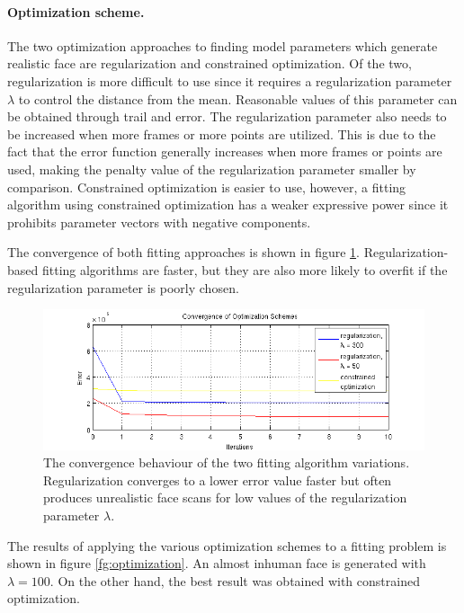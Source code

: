 \documentclass[11pt,a4paper,twoside]{report}
\begin{document}
\paragraph{Optimization scheme.}
The two optimization approaches to finding model parameters which generate
realistic face are regularization and constrained optimization. Of the two,
regularization is more difficult to use since it requires a regularization
parameter $\lambda$ to control the distance from the mean. Reasonable values of
this parameter can be obtained through trail and error. The regularization
parameter also needs to be increased when more frames or more points are
utilized. This is due to the fact that the error function generally increases when more
frames or points are used, making the penalty value of the regularization
parameter smaller by comparison. Constrained optimization is easier to use,
however, a fitting algorithm using constrained optimization has a weaker
expressive power since it prohibits parameter vectors with negative
components. 

The convergence of both fitting approaches is shown in figure
\ref{fg:convergence}. Regularization-based fitting algorithms are faster, but
they are also more likely to overfit if the regularization parameter is poorly chosen.

\begin{figure}[H]
\begin{centering}
\includegraphics[scale=0.75]{images/convergence.png}
\par\end{centering}

\caption{The convergence behaviour of the two fitting algorithm
  variations. Regularization converges to a lower error value faster but often
  produces unrealistic face scans for low values of the regularization parameter
$\lambda$.}
\label{fg:convergence}
\end{figure}
The results of applying the various optimization schemes to a fitting problem is
shown in figure \ref{fg:optimization}. An almost inhuman face is generated with
$\lambda = 100$. On the other hand, the best result was obtained with
constrained optimization. 
\end{document}
